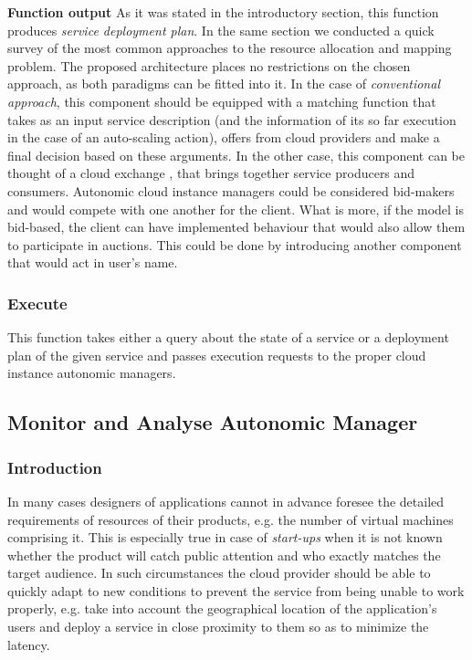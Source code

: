 \begin{asparaenum}
\item[\textbf{Function output}] As it was stated in the introductory section, this function produces \emph{service deployment plan}. In the same section we conducted a quick survey of the most common approaches to the resource allocation and mapping problem. The proposed architecture places no restrictions on the chosen approach, as both paradigms can be fitted into it. In the case of \emph{conventional approach}, this component should be equipped with a matching function that takes as an input service description (and the information of its so far execution in the case of an auto-scaling action), offers from cloud providers and make a final decision based on these arguments.
  In the other case, this component can be thought of a cloud exchange \cite{InterCloud10}, that brings together service producers and consumers. Autonomic cloud instance managers could be considered bid-makers and would compete with one another for the client. What is more, if the model is bid-based, the client can have implemented behaviour that would also allow them to participate in auctions. This could be done by introducing another component that would act in user's name.
\end{asparaenum}

\subsubsection{Execute}
This function takes either a query about the state of a service or a deployment plan of the given service and passes execution requests to the proper cloud instance autonomic managers.

\subsection{Monitor and Analyse Autonomic Manager}
\subsubsection*{Introduction}
In many cases designers of applications cannot in advance foresee the detailed requirements of resources of their products, e.g. the number of virtual machines comprising it. This is especially true in case of \emph{start-ups} when it is not known whether the product will catch public attention and who exactly matches the target audience. In such circumstances the cloud provider should be able to quickly adapt to new conditions to prevent the service from being unable to work properly, e.g. take into account the geographical location of the application's users and deploy a service in close proximity to them so as to minimize the latency.

